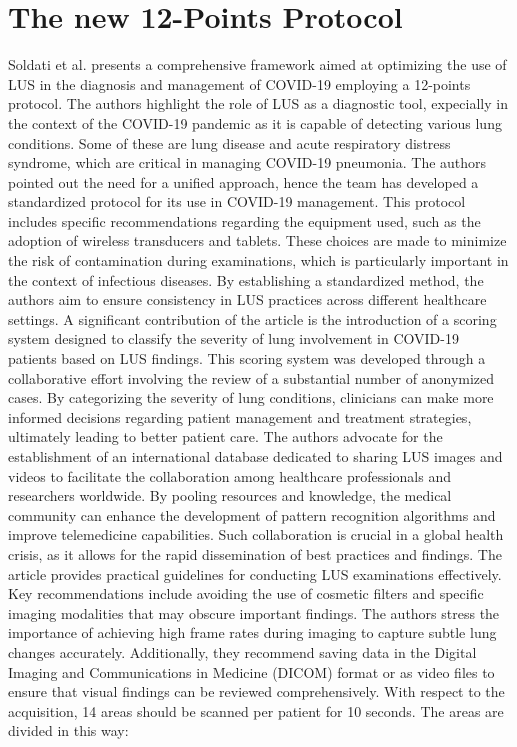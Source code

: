 \section{The new 12-Points Protocol}
Soldati et al. \cite{soldati2020proposal} presents a comprehensive framework aimed at optimizing the use of LUS in the diagnosis and management of COVID-19 employing a 12-points protocol. The authors highlight the  role of LUS as a diagnostic tool, expecially in the context of the COVID-19 pandemic as it is capable of detecting various lung conditions. Some of these are lung disease and acute respiratory distress syndrome, which are critical in managing COVID-19 pneumonia.
The authors pointed out the need for a unified approach, hence the team has developed a standardized protocol for its use in COVID-19 management.
This protocol includes specific recommendations regarding the equipment used, such as the adoption of wireless transducers and tablets.
These choices are made to minimize the risk of contamination during examinations, which is particularly important in the context of infectious diseases. 
By establishing a standardized method, the authors aim to ensure consistency in LUS practices across different healthcare settings.
 A significant contribution of the article is the introduction of a scoring system designed to classify the severity of lung involvement in COVID-19 patients based on LUS findings. This scoring system was developed through a collaborative effort involving the review of a substantial number of anonymized cases. By categorizing the severity of lung conditions, clinicians can make more informed decisions regarding patient management and treatment strategies, ultimately leading to better patient care.
The authors advocate for the establishment of an international database dedicated to sharing LUS images and videos to facilitate the collaboration among healthcare professionals and researchers worldwide. By pooling resources and knowledge, the medical community can enhance the development of pattern recognition algorithms and improve telemedicine capabilities. Such collaboration is crucial in a global health crisis, as it allows for the rapid dissemination of best practices and findings. The article provides practical guidelines for conducting LUS examinations effectively. Key recommendations include avoiding the use of cosmetic filters and specific imaging modalities that may obscure important findings. The authors stress the importance of achieving high frame rates during imaging to capture subtle lung changes accurately. Additionally, they recommend saving data in the Digital Imaging and Communications in Medicine (DICOM) format or as video files to ensure that visual findings can be reviewed comprehensively. With respect to the acquisition, 14 areas should be scanned per patient for 10 seconds. The areas are divided in this way:
